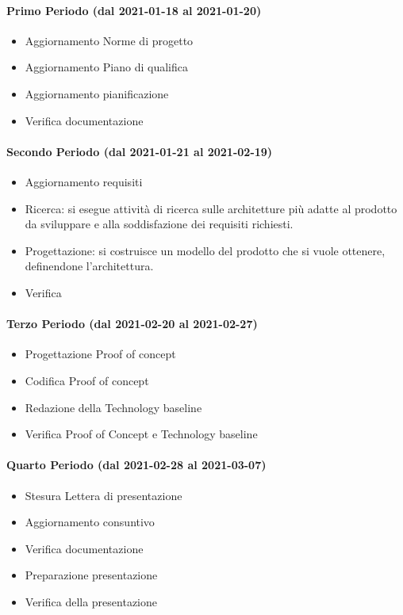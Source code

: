 \paragraph{Primo Periodo (dal 2021-01-18 al 2021-01-20)}
\begin{itemize}
	\item Aggiornamento Norme di progetto
	\item Aggiornamento Piano di qualifica
	\item Aggiornamento pianificazione
	\item Verifica documentazione
\end{itemize}

\paragraph{Secondo Periodo (dal 2021-01-21 al 2021-02-19)}
\begin{itemize}
	\item Aggiornamento requisiti
	\item Ricerca: si esegue attività di ricerca sulle architetture più adatte al prodotto da sviluppare e alla soddisfazione dei requisiti richiesti.
	\item Progettazione: si costruisce un modello del prodotto che si vuole ottenere, definendone l'architettura.
	\item Verifica
\end{itemize}

\paragraph{Terzo Periodo (dal 2021-02-20 al 2021-02-27)}
\begin{itemize}
	\item Progettazione Proof of concept
	\item Codifica Proof of concept
	\item Redazione della Technology baseline
	\item Verifica Proof of Concept e Technology baseline
\end{itemize}

\paragraph{Quarto Periodo (dal 2021-02-28 al 2021-03-07)}
\begin{itemize}
	\item Stesura Lettera di presentazione
	\item Aggiornamento consuntivo
	\item Verifica documentazione
	\item Preparazione presentazione
	\item Verifica della presentazione
\end{itemize}

